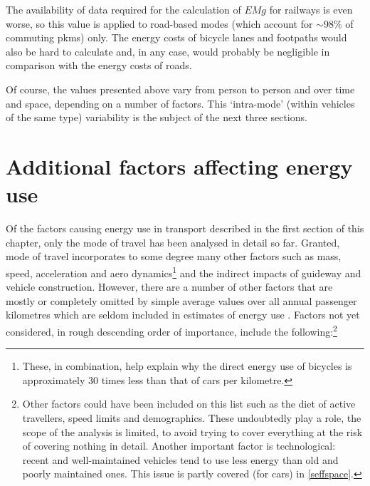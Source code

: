 The availability of data required for the calculation of
$EMg$ for railways is even worse, so this value is applied to road-based modes
(which account for $\sim$98\% of commuting pkms) only.
The energy costs of bicycle lanes and footpaths would also be hard to
calculate and, in any case, would probably be negligible in comparison
with the energy costs of roads.

Of course, the values presented above vary from person to person and
over time and space, depending on a number of
factors. This `intra-mode' (within vehicles of the
same type) variability is the subject of the next three sections.

\section{Additional factors affecting energy use} \label{svariable}
Of the factors causing energy use in transport described in the first
section of this chapter, only the mode of travel has been analysed in
detail so far. Granted, mode of travel incorporates to some degree many
other factors such as mass, speed, acceleration and aero
dynamics\footnote{These,
in combination, help explain why the direct energy use of bicycles is
approximately 30 times less than that of cars per kilometre.} and the indirect
impacts of guideway and vehicle construction. However, there are a number of other
factors that are mostly or completely omitted by simple average values over
all annual passenger kilometres which are seldom included in estimates of
energy use \citep{Schipper1993}. Factors not yet considered, in rough
descending order of importance, include the following:\footnote{Other factors
could have been included on this list such as the diet of active travellers,
speed limits and demographics. These undoubtedly play a role, the scope of the
analysis is limited, to avoid trying to cover everything at
the risk of covering nothing in detail. Another important factor is
technological: recent and well-maintained vehicles tend to use less energy
than old and poorly maintained ones. This issue is partly covered (for cars)
in \cref{seffspace}.
}
